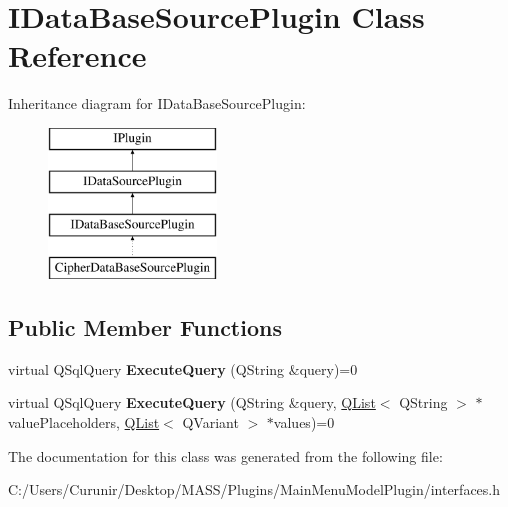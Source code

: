 \hypertarget{class_i_data_base_source_plugin}{}\section{I\+Data\+Base\+Source\+Plugin Class Reference}
\label{class_i_data_base_source_plugin}
Inheritance diagram for I\+Data\+Base\+Source\+Plugin\+:\begin{figure}[H]
\begin{center}
\leavevmode
\includegraphics[height=4.000000cm]{class_i_data_base_source_plugin}
\end{center}
\end{figure}
\subsection*{Public Member Functions}
\begin{DoxyCompactItemize}
\item 
\mbox{\label{class_i_data_base_source_plugin_a4ec8ebd5229431cf3b87548f258960b8}} 
virtual Q\+Sql\+Query {\bfseries Execute\+Query} (Q\+String \&query)=0
\item 
\mbox{\label{class_i_data_base_source_plugin_a0f7fce934bf41f5f18c52951a7eb179c}} 
virtual Q\+Sql\+Query {\bfseries Execute\+Query} (Q\+String \&query, \hyperlink{class_q_list}{Q\+List}$<$ Q\+String $>$ $\ast$value\+Placeholders, \hyperlink{class_q_list}{Q\+List}$<$ Q\+Variant $>$ $\ast$values)=0
\end{DoxyCompactItemize}


The documentation for this class was generated from the following file\+:\begin{DoxyCompactItemize}
\item 
C\+:/\+Users/\+Curunir/\+Desktop/\+M\+A\+S\+S/\+Plugins/\+Main\+Menu\+Model\+Plugin/interfaces.\+h\end{DoxyCompactItemize}
